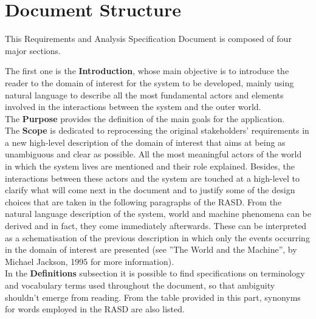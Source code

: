 \section{Document Structure}

This Requirements and Analysis Specification Document is composed of four major sections.

The first one is the \textbf{Introduction}, whose main objective is to introduce the reader to the domain
of interest for the system to be developed, mainly using natural language to describe all the most
fundamental actors and elements involved in the interactions between the system and the outer world. \\
The \textbf{Purpose} provides the definition of the main goals for the application. \\
The \textbf{Scope} is dedicated to reprocessing the original stakeholders’ requirements in a new high-level
description of the domain of interest that aims at being as unambiguous and clear as possible. All the
most meaningful actors of the world in which the system lives are mentioned and their role explained.
Besides, the interactions between these actors and the system are touched at a high-level to clarify
what will come next in the document and to justify some of the design choices that are taken in the
following paragraphs of the RASD. From the natural language description of the system, world and
machine phenomena can be derived and in fact, they come immediately afterwards. These can be
interpreted as a schematisation of the previous description in which only the events occurring in the
domain of interest are presented (see ”The World and the Machine”, by Michael Jackson, 1995 for
more information). \\
In the \textbf{Definitions} subsection it is possible to find specifications on terminology and vocabulary terms
used throughout the document, so that ambiguity shouldn’t emerge from reading. From the table
provided in this part, synonyms for words employed in the RASD are also listed.

